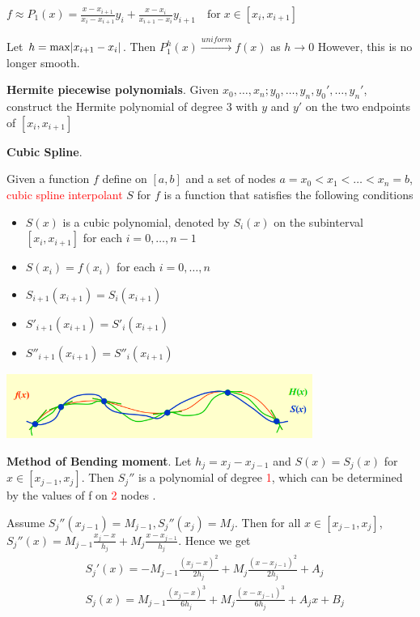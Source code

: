 \documentclass[11pt]{article}
\begin{document}
\(f\approx P_1(x)=\frac{x-x_{i+1}}{x_i-x_{i+1}}y_i+\frac{x-x_i}
   {x_{i+1}-x_i}y_{i+1} \quad\text{for} \;x\in[x_i,x_{i+1}]\) 

Let \(h=\max\abs{x_{i+1}-x_i}\). Then \(P_1^h(x)\xrightarrow{uniform} f(x)\) as
\(h\to 0\) 
However, this is no longer smooth.

\textbf{Hermite piecewise polynomials}. Given
\(x_0,\dots,x_n;y_0,\dots,y_n,y_0',\dots,y_n'\), construct the Hermite
polynomial of degree 3 with \(y\) and \(y'\) on the two endpoints of
\([x_i,x_{i+1}]\)

\textbf{Cubic Spline}.
\begin{definition}
Given a function $f$ define on $[a,b]$ and a set of nodes $a=x_0<x_1<\dots<x_n=b$,
\textcolor{red}{cubic spline interpolant} $S$ for $f$ is a function that satisfies
the following conditions
\begin{itemize}
\item $S(x)$ is a cubic polynomial, denoted by $S_i(x)$ on the subinterval
$[x_i,x_{i+1}]$ for each $i=0,\dots,n-1$
\item $S(x_i)=f(x_i)$ for each $i=0,\dots, n$
\item $S_{i+1}(x_{i+1})=S_i(x_{i+1})$
\item $S'_{i+1}(x_{i+1})=S'_i(x_{i+1})$
\item $S''_{i+1}(x_{i+1})=S''_i(x_{i+1})$
\end{itemize}
\end{definition}

\includegraphics[width=100mm]{CubicSpline}

\textbf{Method of Bending moment}. Let \(h_j=x_j-x_{j-1}\) and \(S(x)=S_j(x)\) for
\(x\in[x_{j-1}, x_j]\). Then \(S_j''\) is a polynomial of degree
\textcolor{red}{1}, which can be determined by the values of f on
\textcolor{red}{2} nodes .

Assume \(S_j''(x_{j-1})=M_{j-1},S_j''(x_j)=M_j\). Then for all
\(x\in[x_{j-1},x_j]\),
\(S_j''(x)=M_{j-1}\frac{x_j-x}{h_j}+M_j\frac{x-x_{j-1}}{h_j}\). Hence we get
\begin{align*}
&S_j'(x)=-M_{j-1}\frac{(x_j-x)^2}{2h_j}+M_j\frac{(x-x_{j-1})^2}{2h_j}+A_j\\
&S_j(x)=M_{j-1}\frac{(x_j-x)^3}{6h_j}+M_j\frac{(x-x_{j-1})^3}{6h_j}+A_jx+B_j
\end{align*}
\end{document}
